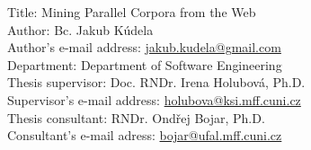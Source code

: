 
Title: Mining Parallel Corpora from the Web \\
Author: Bc. Jakub Kúdela \\
Author's e-mail address: \url{jakub.kudela@gmail.com} \\
Department: Department of Software Engineering \\
Thesis supervisor: Doc. RNDr. Irena Holubová, Ph.D. \\
Supervisor's e-mail address: \url{holubova@ksi.mff.cuni.cz} \\
Thesis consultant: RNDr. Ondřej Bojar, Ph.D. \\
Consultant's e-mail adress: \url{bojar@ufal.mff.cuni.cz}

